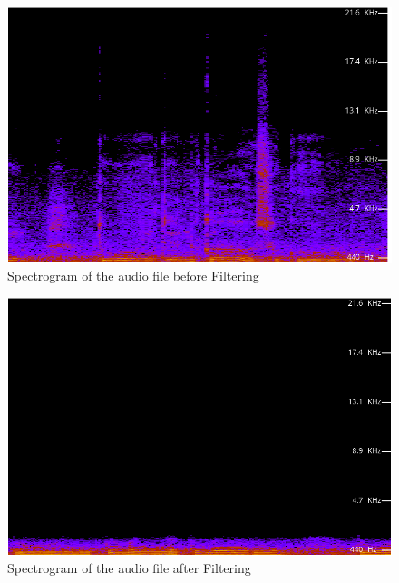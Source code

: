 \documentclass[journal,12pt,twocolumn]{IEEEtran}
\theoremstyle{remark}
\begin{document}
\begin{enumerate}[label=\thesection.\arabic*
		,ref=\thesection.\theenumi]
		\begin{figure}[H]
			    \includegraphics[width=0.8\columnwidth]{figs/A1.png }
			        \caption{Spectrogram of the audio file before Filtering}
				    \label{fig:before_filter_plot}
		\end{figure}
		\begin{figure}[H]
			\includegraphics[width=0.8\columnwidth]{figs/A2.png}
			    \caption{Spectrogram of the audio file after Filtering}
			        \label{fig:after_filter_plot}
		\end{figure}



\end{enumerate}
\end{document}
